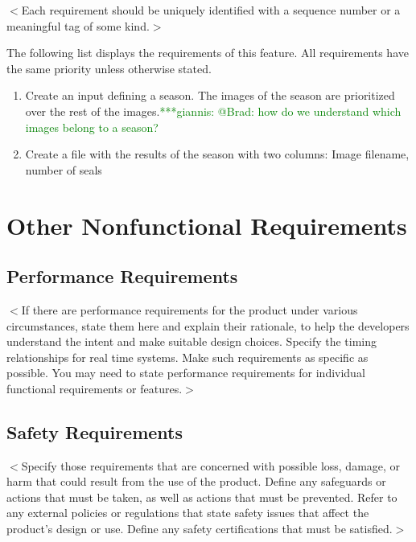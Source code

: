 \documentclass{scrreprt}
\newcommand{\gpnote}[1]{{\textcolor{green} {***giannis: #1}}}
\begin{document}
$<$Each requirement should be uniquely identified with a sequence number or a 
meaningful tag of some kind.$>$
\fi

The following list displays the requirements of this feature. All requirements
have the same priority unless otherwise stated. 


\begin{enumerate}[REQ-1:]
	\item Create an input defining a season. The images of the season are prioritized
	over the rest of the images.\gpnote{@Brad: how do we understand which images belong to a season?}
	\item Create a file with the results of the season with two columns: Image 
	filename, number of seals
\end{enumerate}



\chapter{Other Nonfunctional Requirements}

\section{Performance Requirements}
$<$If there are performance requirements for the product under various 
circumstances, state them here and explain their rationale, to help the 
developers understand the intent and make suitable design choices. Specify the 
timing relationships for real time systems. Make such requirements as specific 
as possible. You may need to state performance requirements for individual 
functional requirements or features.$>$

\section{Safety Requirements}
$<$Specify those requirements that are concerned with possible loss, damage, or 
harm that could result from the use of the product. Define any safeguards or 
actions that must be taken, as well as actions that must be prevented. Refer to 
any external policies or regulations that state safety issues that affect the 
product’s design or use. Define any safety certifications that must be 
satisfied.$>$
\end{document}
